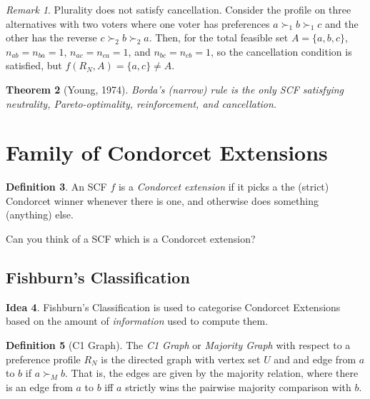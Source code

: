 \documentclass{book}
\newcommand{\unclear}[1]{%
  \par\noindent
  \colorbox{yellow!30}{#1}\par
}
\theoremstyle{plain}
\newtheorem{theorem}{Theorem}[subsection]
\theoremstyle{definition}
\newtheorem{definition}[theorem]{Definition}
\newtheorem{idea}[theorem]{Idea}
\theoremstyle{remark}
\newtheorem{remark}[theorem]{Remark}
\begin{document}
\begin{remark}
    Plurality does not satisfy cancellation.
    Consider the profile on three alternatives with two voters where one voter
    has preferences 
    $a \succ_1 b \succ_1 c$
    and the other has 
    the reverse $c \succ_2 b \succ_2 a$.
    Then, for the total feasible set
    $A = \{a, b, c\}$,
    $n_{ab} = n_{ba} = 1$,
    $n_{ac} = n_{ca} = 1$, and
    $n_{bc} = n_{cb} = 1$,
    so the cancellation condition is satisfied, but
    $f(R_N, A) = \{a, c\} \neq A$.
\end{remark}

\begin{theorem}[Young, 1974]
    Borda's (narrow) rule 
    is the only SCF satisfying 
    neutrality, Pareto-optimality, 
    reinforcement, 
    and cancellation.
\end{theorem}

\section{Family of Condorcet Extensions}

\begin{definition}
    An SCF $f$ is a \emph{Condorcet extension} 
    if it picks a the (strict) Condorcet winner 
    whenever there is one, and otherwise does something (anything) else.
\end{definition}

\unclear{Can you think of a SCF which is a Condorcet extension?}

\subsection{Fishburn's Classification}

\begin{idea}
    Fishburn's Classification is used to
    categorise Condorcet Extensions based on the 
    amount of \emph{information} used to compute them.
\end{idea}

\begin{definition}[C1 Graph]
    The \emph{C1 Graph} or \emph{Majority Graph}
    with respect to a preference profile 
    $R_N$ is the directed graph with vertex set $U$ and
    and edge from 
    $a$ to $b$ if $a \succ_M b$.
    That is, the edges are given by the majority relation,
    where there is an edge from $a$ to $b$ iff 
    $a$ strictly wins the pairwise majority comparison with
    $b$.
\end{definition}
\end{document}
